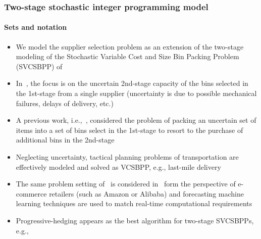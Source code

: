 \documentclass[9pt,xcolor={dvipsnames}]{beamer}
\begin{document}
\begin{frame}[allowframebreaks]
	\frametitle{Two-stage stochastic integer programming model}
	\framesubtitle{Sets and notation}
	\begin{itemize}
		\small
		\item We model the supplier selection problem as an extension of the two-stage modeling of the Stochastic Variable Cost and Size Bin Packing Problem (SVCSBPP) of~\cite{crainic2024}
		\medskip
		\item In~\cite{crainic2024}, the focus is on the uncertain 2nd-stage capacity of the bins selected in the 1st-stage from a single supplier (uncertainty is due to possible mechanical failures, delays of delivery, etc.)
		\medskip
		\item A previous work, i.e.,~\cite{crainic2016logistics}, considered the problem of packing an uncertain set of items into a set of bins select in the 1st-stage to resort to the purchase of additional bins in the 2nd-stage
		\medskip
		\item Neglecting uncertainty, tactical planning problems of transportation are effectively modeled and solved as VCSBPP, e.g., last-mile delivery~\cite{perboli2021new}
		\medskip
		\item The same problem setting of~\cite{crainic2016logistics} is considered in~\cite{bruni2023machine} form the perspective of e-commerce retailers (such as Amazon or Alibaba) and forecasting machine learning techniques are used to match real-time computational requirements
		\medskip
		\item Progressive-hedging appears as the best algorithm for two-stage SVCSBPPs, e.g.,~\cite{bruni2023machine, crainic2016logistics, crainic2024}
	\end{itemize}
\end{frame}
\end{document}
